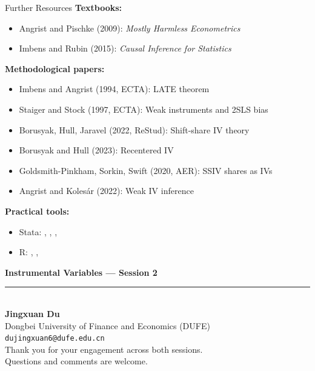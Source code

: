 \documentclass{beamer}
\begin{document}
\begin{frame}{Further Resources}
\textbf{Textbooks:}
\begin{itemize}
  \item Angrist and Pischke (2009): \emph{Mostly Harmless Econometrics}
  \item Imbens and Rubin (2015): \emph{Causal Inference for Statistics}
\end{itemize}

\medskip
\textbf{Methodological papers:}
\begin{itemize}
  \item Imbens and Angrist (1994, ECTA): LATE theorem
  \item Staiger and Stock (1997, ECTA): Weak instruments and 2SLS bias
  \item Borusyak, Hull, Jaravel (2022, ReStud): Shift-share IV theory
  \item Borusyak and Hull (2023): Recentered IV
  \item Goldsmith-Pinkham, Sorkin, Swift (2020, AER): SSIV shares as IVs
  \item Angrist and Koles\'ar (2022): Weak IV inference
\end{itemize}

\medskip
\textbf{Practical tools:}
\begin{itemize}
  \item Stata: , , ,
  \item R: , , 
\end{itemize}
\end{frame}

\begin{frame}[plain]
\begin{center}
\vspace{1cm}
{\large\color{dufenavy}\textbf{Instrumental Variables --- Session 2}}\\[8pt]
\rule{0.6\textwidth}{0.5pt}\\[10pt]
\textbf{Jingxuan Du}\\[4pt]
Dongbei University of Finance and Economics (DUFE)\\[6pt]
\texttt{dujingxuan6@dufe.edu.cn}\\[12pt]
{\color{dufegray}\small Thank you for your engagement across both sessions.\\
Questions and comments are welcome.}
\end{center}
\end{frame}
\end{document}
